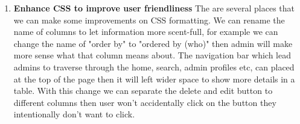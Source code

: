 \documentclass[onecolumn, draftclsnofoot,10pt, compsoc]{IEEEtran}
\begin{document}
\begin{enumerate}
    \item \textbf{Enhance CSS to improve user friendliness}\newline
    The are several places that we can make some improvements on CSS formatting. We can rename the name of columns to let information more scent-full, for example we can change the name of "order by" to "ordered by (who)" then admin will make more sense what that column means about. The navigation bar which lead admins to traverse through the home, search, admin profiles etc, can placed at the top of the page then it will left wider space to show more details in a table. With this change we can separate the delete and edit button to different columns then user won't accidentally click on the button they intentionally don't want to click. \newline
    
\end{enumerate}
\end{document}
